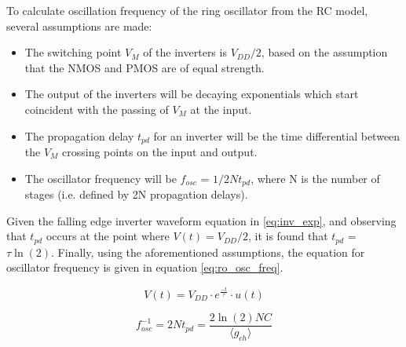 		To calculate oscillation frequency of the ring oscillator from the RC model, several assumptions are made:
		\begin{itemize}
			\item The switching point $V_M$ of the inverters is $V_{DD}/2$, based on the assumption that the NMOS and PMOS are of equal strength.
			\item The output of the inverters will be decaying exponentials which start coincident with the passing of $V_M$ at the input.
			\item The propagation delay $t_{pd}$ for an inverter will be the time differential between the $V_M$ crossing points on the input and output.
			\item The oscillator frequency will be $f_{osc}$ = $1/2Nt_{pd}$, where N is the number of stages (i.e. defined by 2N propagation delays).
		\end{itemize}
			Given the falling edge inverter waveform equation in \ref{eq:inv_exp}, and observing that $t_{pd}$ occurs at the point where $V(t) = V_{DD}/2$, it is found that $t_{pd}$ = $\tau\ln(2)$. Finally, using the aforementioned assumptions, the equation for oscillator frequency is given in equation \ref{eq:ro_osc_freq}.

			\begin{equation}\label{eq:inv_exp}
			V(t) = V_{DD}\cdot e^{\frac{-t}{\tau}}\cdot u(t)
			\end{equation}

			\begin{equation}\label{eq:ro_osc_freq}
				f_{osc}^{-1} = 2Nt_{pd} = \frac{2\ln(2)NC}{\langle g_{ch}\rangle}
			\end{equation}


